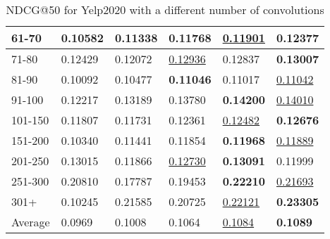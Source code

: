 \begin{table*}[]
\begin{tabular}{|l|l|l|l|l|l|}
        61-70   & 0.10582                    & 0.11338                    & 0.11768                    & \underline{0.11901}        & \textbf{0.12377}           \\ \hline
        71-80   & 0.12429                    & 0.12072                    & \underline{0.12936}        & 0.12837                    & \textbf{0.13007}           \\ \hline
        81-90   & 0.10092                    & 0.10477                    & \textbf{0.11046}           & 0.11017                    & \underline{0.11042}        \\ \hline
        91-100  & 0.12217                    & 0.13189                    & 0.13780                    & \textbf{0.14200}           & \underline{0.14010}        \\ \hline
        101-150 & 0.11807                    & 0.11731                    & 0.12361                    & \underline{0.12482}        & \textbf{0.12676}           \\ \hline
        151-200 & 0.10340                    & 0.11441                    & 0.11854                    & \textbf{0.11968}           & \underline{0.11889}        \\ \hline
        201-250 & 0.13015                    & 0.11866                    & \underline{0.12730}        & \textbf{0.13091}           & 0.11999                    \\ \hline
        251-300 & 0.20810                    & 0.17787                    & 0.19453                    & \textbf{0.22210}           & \underline{0.21693}        \\ \hline
        301+    & 0.10245                    & 0.21585                    & 0.20725                    & \underline{0.22121}        & \textbf{0.23305}           \\ \hline
        Average & 0.0969                     & 0.1008                     & 0.1064                     & \underline{0.1084}         & \textbf{0.1089}            \\ \hline
    \end{tabular}
    \caption{NDCG@50 for Yelp2020 with a different number of convolutions}
    \centering
    \label{tab:yelp2020-con-evaluation}
\end{table*}

